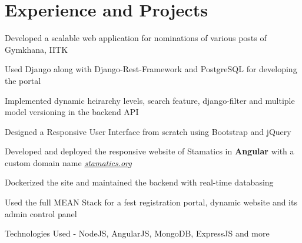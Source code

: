 \documentclass[]{deedy-resume-openfont}
\begin{document}
\hfill
\begin{minipage}[t]{0.69\textwidth} 


\section{Experience and Projects}
\vspace{\topsep} %
\begin{tightemize}
  \item Developed a scalable web application for nominations of various posts of Gymkhana, IITK
  \item Used Django along with Django-Rest-Framework and PostgreSQL for developing the portal
  \item	Implemented dynamic heirarchy levels, search feature, django-filter and multiple model versioning in the backend API \\
  \item Designed a Responsive User Interface from scratch using Bootstrap and jQuery
\end{tightemize}

\begin{tightemize}
  \item Developed and deployed the responsive website of Stamatics in \textbf{Angular} with a custom domain name \href{http://stamatics.org}{\textit{stamatics.org}}
  \item Dockerized the site and maintained the backend with real-time databasing
\end{tightemize}
\begin{tightemize}
  \item Used the full MEAN Stack for a fest registration portal, dynamic website
    and its admin control panel
  \item Technologies Used - NodeJS, AngularJS, MongoDB, ExpressJS and more
\end{tightemize}


\end{minipage}
\end{document}
